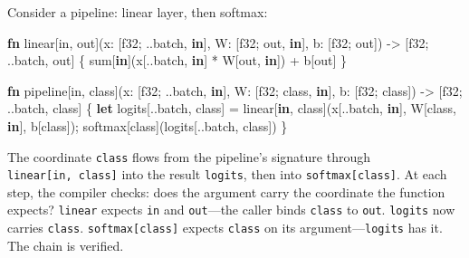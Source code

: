 \documentclass[11pt,titlepage]{article}
\newenvironment{Shaded}{}{}
\newcommand{\DataTypeTok}[1]{\textcolor[rgb]{0.56,0.13,0.00}{#1}}
\newcommand{\KeywordTok}[1]{\textcolor[rgb]{0.00,0.44,0.13}{\textbf{#1}}}
\newcommand{\NormalTok}[1]{#1}
\newcommand{\OperatorTok}[1]{\textcolor[rgb]{0.40,0.40,0.40}{#1}}
\begin{document}
Consider a pipeline: linear layer, then softmax:

\begin{Shaded}
\begin{Highlighting}[]
\KeywordTok{fn}\NormalTok{ linear[in, out](x: }\OperatorTok{[}\DataTypeTok{f32}\NormalTok{; ..batch, }\KeywordTok{in}\OperatorTok{]}\NormalTok{, W: }\OperatorTok{[}\DataTypeTok{f32}\NormalTok{; out, }\KeywordTok{in}\OperatorTok{]}\NormalTok{, b: }\OperatorTok{[}\DataTypeTok{f32}\NormalTok{; out}\OperatorTok{]}\NormalTok{)}
\NormalTok{    -> }\OperatorTok{[}\DataTypeTok{f32}\NormalTok{; ..batch, out}\OperatorTok{]}
\OperatorTok{\{}
\NormalTok{    sum}\OperatorTok{[}\KeywordTok{in}\OperatorTok{]}\NormalTok{(x}\OperatorTok{[}\NormalTok{..batch, }\KeywordTok{in}\OperatorTok{]}\NormalTok{ * W}\OperatorTok{[}\NormalTok{out, }\KeywordTok{in}\OperatorTok{]}\NormalTok{) + b}\OperatorTok{[}\NormalTok{out}\OperatorTok{]}
\OperatorTok{\}}

\KeywordTok{fn}\NormalTok{ pipeline[in, class](x: }\OperatorTok{[}\DataTypeTok{f32}\NormalTok{; ..batch, }\KeywordTok{in}\OperatorTok{]}\NormalTok{, W: }\OperatorTok{[}\DataTypeTok{f32}\NormalTok{; class, }\KeywordTok{in}\OperatorTok{]}\NormalTok{, b: }\OperatorTok{[}\DataTypeTok{f32}\NormalTok{; class}\OperatorTok{]}\NormalTok{)}
\NormalTok{    -> }\OperatorTok{[}\DataTypeTok{f32}\NormalTok{; ..batch, class}\OperatorTok{]}
\OperatorTok{\{}
    \KeywordTok{let}\NormalTok{ logits}\OperatorTok{[}\NormalTok{..batch, class}\OperatorTok{]}\NormalTok{ = linear}\OperatorTok{[}\KeywordTok{in}\NormalTok{, class}\OperatorTok{]}\NormalTok{(x}\OperatorTok{[}\NormalTok{..batch, }\KeywordTok{in}\OperatorTok{]}\NormalTok{, W}\OperatorTok{[}\NormalTok{class, }\KeywordTok{in}\OperatorTok{]}\NormalTok{, b}\OperatorTok{[}\NormalTok{class}\OperatorTok{]}\NormalTok{);}
\NormalTok{    softmax}\OperatorTok{[}\NormalTok{class}\OperatorTok{]}\NormalTok{(logits}\OperatorTok{[}\NormalTok{..batch, class}\OperatorTok{]}\NormalTok{)}
\OperatorTok{\}}
\end{Highlighting}
\end{Shaded}

The coordinate \texttt{class} flows from the pipeline's signature
through \texttt{linear{[}in,\ class{]}} into the result \texttt{logits},
then into \texttt{softmax{[}class{]}}. At each step, the compiler
checks: does the argument carry the coordinate the function expects?
\texttt{linear} expects \texttt{in} and \texttt{out}---the caller binds
\texttt{class} to \texttt{out}. \texttt{logits} now carries
\texttt{class}. \texttt{softmax{[}class{]}} expects \texttt{class} on
its argument---\texttt{logits} has it. The chain is verified.
\end{document}
